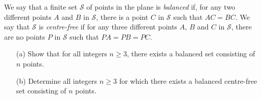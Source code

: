 We say that a finite set $\mathcal{S}$ of points in the plane
is \emph{balanced} if,
for any two different points $A$ and $B$ in $\mathcal{S}$,
there is a point $C$ in $\mathcal{S}$ such that $AC=BC$.
We say that $\mathcal{S}$ is \emph{centre-free} if for
any three different points $A$, $B$ and $C$ in $\mathcal{S}$,
there are no points $P$ in $\mathcal{S}$ such that $PA=PB=PC$.

\begin{enumerate}
\item[(a)] Show that for all integers $n\ge 3$,
  there exists a balanced set consisting of $n$ points.
\item[(b)] Determine all integers $n\ge 3$ for which
  there exists a balanced centre-free set consisting of $n$ points.
\end{enumerate}